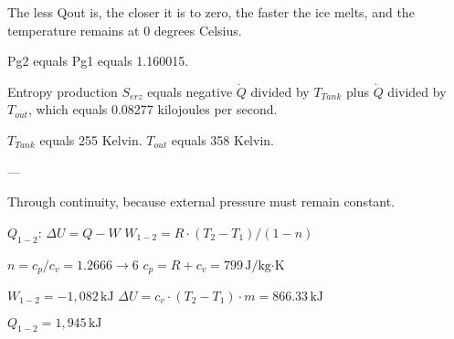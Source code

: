 The less Qout is, the closer it is to zero, the faster the ice melts, and the temperature remains at 0 degrees Celsius.  

Pg2 equals Pg1 equals 1.160015.

Entropy production \( S_{erz} \) equals negative \( \dot{Q} \) divided by \( T_{Tank} \) plus \( \dot{Q} \) divided by \( T_{out} \), which equals 0.08277 kilojoules per second.

\( T_{Tank} \) equals 255 Kelvin. \( T_{out} \) equals 358 Kelvin.

---

Through continuity, because external pressure must remain constant.  

\( Q_{1-2} \):  
\( \Delta U = Q - W \)  
\( W_{1-2} = R \cdot (T_2 - T_1) / (1 - n) \)  

\( n = c_p / c_v = 1.2666 \rightarrow 6 \)  
\( c_p = R + c_v = 799 \, \text{J/kg·K} \)  

\( W_{1-2} = -1,082 \, \text{kJ} \)  
\( \Delta U = c_v \cdot (T_2 - T_1) \cdot m = 866.33 \, \text{kJ} \)  

\( Q_{1-2} = 1,945 \, \text{kJ} \)
